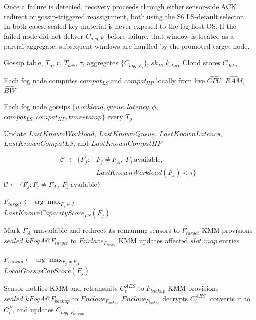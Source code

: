 \documentclass[conference]{IEEEtran}
\begin{document}
    Once a failure is detected, recovery proceeds through either sensor-side ACK redirect or gossip-triggered reassignment, both using the S6 LS-default selector. In both cases, sealed key material is never exposed to the fog host OS. If the failed node did not deliver $C_{agg,F_i}$ before failure, that window is treated as a partial aggregate; subsequent windows are handled by the promoted target node.

\begin{algorithm}
\caption{Fault Recovery, Window Combine, and Secure Storage}
\label{alg:fault_window_storage}
\begin{algorithmic}[1]
\REQUIRE Gossip table, $T_g$, $r$, $T_{ack}$, $\tau$, aggregates $\{C_{agg,F_i}\}$, $sk_P$, $k_{store}$
\ENSURE Cloud stores $C_{data}$

\STATE Each fog node computes $compat_{LS}$ and $compat_{HP}$ locally from live $\widehat{CPU}$, $\widehat{RAM}$, $\widehat{BW}$
\STATE \parbox[t]{0.88\linewidth}{Each fog node gossips $\{workload, queue, latency, \phi,$\\
$compat_{LS}, compat_{HP}, timestamp\}$ every $T_g$}
\STATE Update $LastKnownWorkload$, $LastKnownQueue$, $LastKnownLatency$, $LastKnownCompatLS$, and $LastKnownCompatHP$

    \STATE \[\begin{aligned}
        \mathcal{C}\;\leftarrow\{F_j: & F_j\neq F_A,\;F_j\ \text{available},\\
        & LastKnownWorkload(F_j)<\tau\}
        \end{aligned}
        \]
        \STATE $\mathcal{C}\leftarrow \{F_j:F_j\neq F_A,\;F_j\ \text{available}\}$
    \ENDIF
    \STATE \parbox[t]{0.88\linewidth}{$F_{target}\leftarrow \arg\max_{F_j\in\mathcal{C}}$\\
    $LastKnownCapacityScore_{LS}(F_j)$}
    \STATE Mark $F_A$ unavailable and redirect its remaining sensors to $F_{target}$
    \STATE KMM provisions $sealed\_kFogA@F_{target}$ to $Enclave_{F_{target}}$
    \STATE KMM updates affected $slot\_map$ entries
\ENDIF

    \STATE \parbox[t]{0.88\linewidth}{$F_{backup}\leftarrow \arg\max_{F_j\neq F_A}$\\
    $LocalGossipCapScore(F_j)$}
    \STATE Sensor notifies KMM and retransmits $C_i^{AES}$ to $F_{backup}$
    \STATE KMM provisions $sealed\_kFogA@F_{backup}$ to $Enclave_{F_{backup}}$
    \STATE $Enclave_{F_{backup}}$ decrypts $C_i^{AES}$, converts it to $C_i^P$, and updates $C_{agg,F_{backup}}$
\ENDIF


\end{algorithmic}
\end{algorithm}
\end{document}
